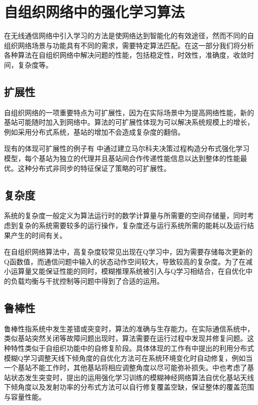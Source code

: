 \documentclass{IEEEtran}
\begin{document}
\section{自组织网络中的强化学习算法}
\label{sec:Compare}
在无线通信网络中引入学习的方法是使网络达到智能化的有效途径，然而不同的自组织网络场景与功能具有不同的需求，需要特定算法匹配。在这一部分我们将分析各种算法在自组织网络中解决问题的性能，包括稳定性，时效性，准确度，收敛时间，复杂度等。
\subsection{扩展性}
自组织网络的一项重要特点为可扩展性，因为在实际场景中为提高网络性能，新的基站可能随时加入到网络中。算法的可扩展性体现为可以解决系统规模上的增长，例如采用分布式系统，基站的增加不会造成复杂度的翻倍。

现有的体现可扩展性的例子有\cite{Dirani2010} 中通过建立马尔科夫决策过程构造分布式强化学习模型，每个基站为独立的代理并且基站间合作传递性能信息以达到整体的性能最优。这种分布式非同步的特征保证了策略的可扩展性。

\subsection{复杂度}
系统的复杂度一般定义为算法运行时的数学计算量与所需要的空间存储量，同时考虑到复杂的系统需要较多的运行操作，复杂度还与运行系统所需的能耗以及运行结果产生的时间有关。

在自组织网络算法中，高复杂度较常见出现在Q学习中，因为需要存储每次更新的Q函数值，而通信问题中输入的状态动作空间较大，导致较高的复杂度。为了在减小运算量又能保证性能的同时，模糊推理系统被引入与Q学习相结合，在自优化中的负载均衡与干扰控制等问题中得到了合适的运用。
\subsection{鲁棒性}
鲁棒性指系统中发生差错或突变时，算法的准确与生存能力。在实际通信系统中，类似基站突然关闭等故障问题出现时，算法需要在运行过程中发现并修复问题。这种特性类似于自组织功能中的自修复阶段。具体体现的工作有\cite{Razavi2010}中提出的利用分布式模糊Q学习调整天线下倾角度的自优化方法可在系统环境变化时自动修复，例如当一个基站不能工作时，其他基站将相应调整角度以尽可能弥补损失。\cite{Fan2014}中也考虑了基站状态发生突变时，提出的运用强化学习训练的模糊神经网络算法自优化基站天线下倾角度以及发射功率的分布式方法可以自行修复覆盖空缺，保证整体的覆盖范围与容量性能。
\end{document}
